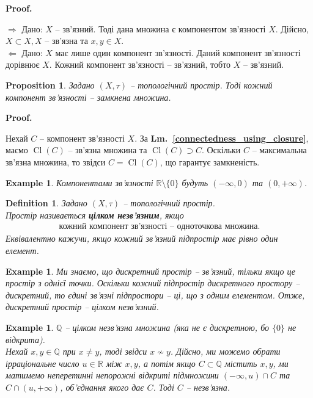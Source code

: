 \documentclass[a4paper, 10pt]{article}
\makeatletter
\def\rightproof{$\boxed{\Rightarrow}$ }
\def\leftproof{$\boxed{\Leftarrow}$ }
\theoremstyle{theoremdd}
\newtheorem{definition}[theorem]{Definition}
\newtheorem{example}[theorem]{Example}
\newtheorem{proposition}[theorem]{Proposition}
\newcommand\lmref[1]{\textbf{Lm.~\ref{#1}}}
\DeclareMathOperator{\Cl}{Cl}
\renewenvironment{proof}[1][Proof.\\]{\par
\pushQED{\hfill \qed}%
\normalfont \topsep6\p@\@plus6\p@\relax
\trivlist
\item\relax
{\bfseries
#1\@addpunct{.}}\hspace\labelsep\ignorespaces
}{%
\popQED\endtrivlist\@endpefalse
}
\makeatother
\begin{document}
\begin{proof}
\rightproof Дано: $X$ -- зв'язний. Тоді дана множина є компонентом зв'язності $X$. Дійсно, $X \subset X, X$ -- зв'язна та $x,y \in X$.
\bigskip \\
\leftproof Дано: $X$ має лише один компонент зв'язності. Даний компонент зв'язності дорівнює $X$. Кожний компонент зв'язності -- зв'язний, тобто $X$ -- зв'язний.
\end{proof}

\begin{proposition}
Задано $(X,\tau)$ -- топологічний простір. Тоді кожний компонент зв'язності -- замкнена множина.
\end{proposition}

\begin{proof}
Нехай $C$ -- компонент зв'язності $X$. За \lmref{connectedness_using_closure}, маємо $\Cl(C)$ -- зв'язна множина та $\Cl(C) \supset C$. Оскільки $C$ -- максимальна зв'язна множина, то звідси $C = \Cl(C)$, що гарантує замкненість.
\end{proof}

\begin{example}
Компонентами зв'язності $\mathbb{R} \setminus \{0\}$ будуть $(-\infty,0)$ та $(0,+\infty)$.
\end{example}

\begin{definition}
Задано $(X,\tau)$ -- топологічний простір.\\
Простір називається \textbf{цілком незв'язним}, якщо
\begin{align*}
\text{кожний компонент зв'язності -- одноточкова множина.}
\end{align*}
Еквівалентно кажучи, якщо кожний зв'язний підпростір має рівно один елемент.
\end{definition}

\begin{example}
Ми знаємо, що дискретний простір -- зв'язний, тільки якщо це простір з однієї точки. Оскільки кожний підпростір дискретного простору -- дискретний, то єдині зв'язні підпростори -- ці, що з одним елементом. Отже, дискретний простір -- цілком незв'язний.
\end{example}

\begin{example}
$\mathbb{Q}$ -- цілком незв'язна множина (яка не є дискретною, бо $\{0\}$ не відкрита).\\
Нехай $x,y \in \mathbb{Q}$ при $x \neq y$, тоді звідси $x \not\sim y$. Дійсно, ми можемо обрати ірраціональне число $u \in \mathbb{R}$ між $x,y$, а потім якщо $C \subset \mathbb{Q}$ містить $x,y$, ми матимемо неперетинні непорожні відкриті підмножини $(-\infty,u) \cap C$ та $C \cap (u,+\infty)$, об'єднання якого дає $C$. Тоді $C$ -- незв'язна.
\end{example}
\newpage
\end{document}
